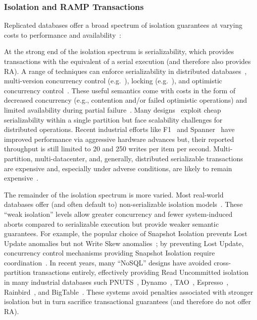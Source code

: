 \subsubsection{Isolation and RAMP Transactions}

Replicated databases offer a broad spectrum of isolation guarantees at
varying costs to performance and availability~\cite{bernstein-book}:

 At the strong end of the isolation spectrum
is serializability, which provides transactions with the equivalent of
a serial execution (and therefore also provides RA). A range of
techniques can enforce serializability in distributed
databases~\cite{bernstein-book,divy-writeonly}, multi-version
concurrency control (e.g.~\cite{mv-mobile}), locking
(e.g.~\cite{versions-update}), and optimistic concurrency
control~\cite{f1}. These useful semantics come with costs in the form
of decreased concurrency (e.g., contention and/or failed optimistic
operations) and limited availability during partial
failure~\cite{hat-vldb,davidson-survey}. Many
designs~\cite{hstore,gstore} exploit cheap serializability within a
single partition but face scalability challenges for distributed
operations. Recent industrial efforts like F1~\cite{f1} and
Spanner~\cite{spanner} have improved performance via aggressive
hardware advances but, their reported throughput is still limited to
20 and 250 writes per item per second. Multi-partition,
multi-datacenter, and, generally, distributed serializable
transactions are expensive and, especially under adverse conditions,
are likely to remain
expensive~\cite{schism,jones-dtxn,pavlo-partition}.

 The remainder of the isolation spectrum is
more varied. Most real-world databases offer (and often default to)
non-serializable isolation models~\cite{mohan-note,hat-vldb}. These
``weak isolation'' levels allow greater concurrency and fewer
system-induced aborts compared to serializable execution but provide
weaker semantic guarantees. For example, the popular choice of
Snapshot Isolation prevents Lost Update anomalies but not Write Skew
anomalies~\cite{adya}; by preventing Lost Update,
concurrency control mechanisms providing Snapshot Isolation require coordination~\cite{hat-vldb}. In recent years, many
``NoSQL'' designs have avoided cross-partition transactions entirely,
effectively providing Read Uncommitted isolation in many industrial
databases such PNUTS~\cite{pnuts}, Dynamo~\cite{dynamo},
TAO~\cite{tao}, Espresso~\cite{espresso}, Rainbird~\cite{rainbird},
and BigTable~\cite{bigtable}. These systems avoid penalties associated
with stronger isolation but in turn sacrifice transactional guarantees
(and therefore do not offer RA).

